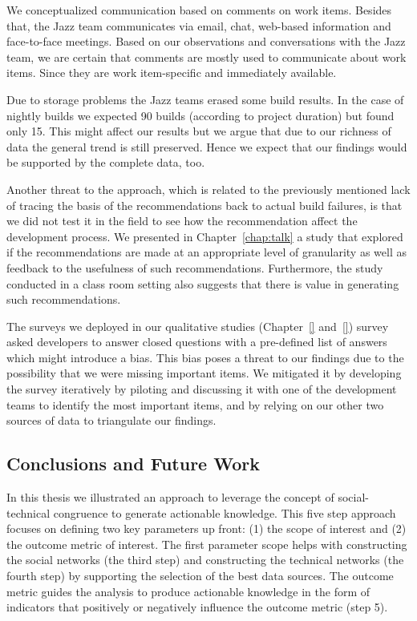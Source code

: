 We conceptualized communication based on comments on work items. Besides
that, the Jazz team communicates via email, chat, web-based information and
face-to-face meetings. Based on our observations and conversations with the Jazz
team, we are certain that comments are mostly used to communicate about work
items. Since they are work item-specific and immediately available.

Due to storage problems the Jazz teams erased some build results. In the case of
nightly builds we expected 90 builds (according to project duration) but found
only 15. This might affect our results but we argue that due to our richness of
data the general trend is still preserved. Hence we expect that our findings
would be supported by the complete data, too.

Another threat to the approach, which is related to the previously mentioned lack of tracing the basis of the recommendations back to actual build failures, is that we did not test it in the field to see how the recommendation affect the development process.
We presented in Chapter~\ref{chap:talk} a study that explored if the recommendations are made at an appropriate level of granularity as well as feedback to the usefulness of such recommendations.
Furthermore, the study conducted in a class room setting also suggests that there is value in generating such recommendations.

The surveys we deployed in our qualitative studies (Chapter~\ref{} and~\ref{}) survey asked developers to answer closed questions with a pre-defined list of answers which might introduce a bias.
This bias poses a threat to our findings due to the possibility that we were missing important items.
We mitigated it by developing the survey iteratively by piloting and discussing it with one of the development teams to identify the most important items, and by relying on our other two sources of data to triangulate our findings.











\subsection{Conclusions and Future Work}
\label{ch:dis:con}
In this thesis we illustrated an approach to leverage the concept of social-technical congruence to generate actionable knowledge.
This five step approach focuses on defining two key parameters up front: (1) the scope of interest and (2) the outcome metric of interest.
The first parameter scope helps with constructing the social networks (the third step) and constructing the technical networks (the fourth step) by supporting the selection of the best data sources.
The outcome metric guides the analysis to produce actionable knowledge in the form of indicators that positively or negatively influence the outcome metric (step 5). 

